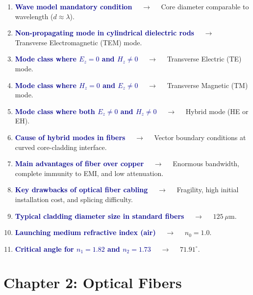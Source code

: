 \documentclass[11pt,a4paper]{article}
\begin{document}
\begin{enumerate}[label=\arabic*., leftmargin=*, labelsep=0.8em, itemsep=0.35em, parsep=0.1em, topsep=0.2em]
  \item \textcolor{darkblue}{\textbf{Wave model mandatory condition}} $\quad\to\quad$ Core diameter comparable to wavelength ($d \approx \lambda$).
  \item \textcolor{darkblue}{\textbf{Non-propagating mode in cylindrical dielectric rods}} $\quad\to\quad$ Transverse Electromagnetic (TEM) mode.
  \item \textcolor{darkblue}{\textbf{Mode class where $E_z = 0$ and $H_z \neq 0$}} $\quad\to\quad$ Transverse Electric (TE) mode.
  \item \textcolor{darkblue}{\textbf{Mode class where $H_z = 0$ and $E_z \neq 0$}} $\quad\to\quad$ Transverse Magnetic (TM) mode.
  \item \textcolor{darkblue}{\textbf{Mode class where both $E_z \neq 0$ and $H_z \neq 0$}} $\quad\to\quad$ Hybrid mode (HE or EH).
  \item \textcolor{darkblue}{\textbf{Cause of hybrid modes in fibers}} $\quad\to\quad$ Vector boundary conditions at curved core-cladding interface.
  \item \textcolor{darkblue}{\textbf{Main advantages of fiber over copper}} $\quad\to\quad$ Enormous bandwidth, complete immunity to EMI, and low attenuation.
  \item \textcolor{darkblue}{\textbf{Key drawbacks of optical fiber cabling}} $\quad\to\quad$ Fragility, high initial installation cost, and splicing difficulty.
  \item \textcolor{darkblue}{\textbf{Typical cladding diameter size in standard fibers}} $\quad\to\quad$ $125\ \mu\text{m}$.
  \item \textcolor{darkblue}{\textbf{Launching medium refractive index (air)}} $\quad\to\quad$ $n_0 = 1.0$.
  \item \textcolor{darkblue}{\textbf{Critical angle for $n_1 = 1.82$ and $n_2 = 1.73$}} $\quad\to\quad$ $71.91^\circ$.
\end{enumerate}

\section*{Chapter 2: Optical Fibers}
\end{document}
